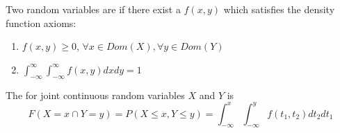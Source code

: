 \documentclass[12pt]{report}
\begin{document}
\begin{defn}{}{}
    Two random variables are  if there exist a  $f(x,y)$ which satisfies the density function axioms: \begin{enumerate}
        \item $f(x,y) \geq 0$, $\forall x \in Dom(X),\forall y \in Dom(Y)$
        \item $\int_{-\infty}^{\infty}\int_{-\infty}^{\infty}f(x,y)dxdy =1$
    \end{enumerate}
\end{defn}


\begin{defn}{}{}
    The  for joint continuous random variables $X$ and $Y$ is \begin{equation*}
        F(X = x\cap Y = y) = P(X \leq x, Y \leq y) = \int_{-\infty}^x\int_{-\infty}^yf(t_1,t_2)dt_2dt_1
    \end{equation*}
\end{defn}





\end{document}

